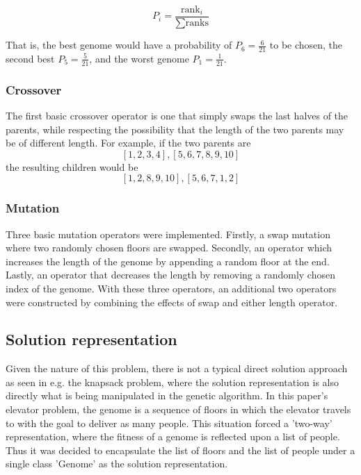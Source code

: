     $$ P_i = \frac{\text{rank}_i}{\sum \text{ranks}} $$

    That is, the best genome would have a probability of $ P_6 = \frac{6}{21} $ to be chosen, the second best $ P_5 = \frac{5}{21} $, and the worst genome $ P_1 = \frac{1}{21} $.

\subsubsection{Crossover}

	The first basic crossover operator is one that simply swaps the last halves of the parents, while respecting the possibility that the length of the two parents may be of different length. For example, if the two parents are $$ [1, 2, 3, 4], [5, 6, 7, 8, 9, 10] $$ the resulting children would be $$ [1, 2, 8, 9, 10], [5, 6, 7, 1, 2] $$

\subsubsection{Mutation}

	Three basic mutation operators were implemented. Firstly, a swap mutation where two randomly chosen floors are swapped. Secondly, an operator which increases the length of the genome by appending a random floor at the end. Lastly, an operator that decreases the length by removing a randomly chosen index of the genome. With these three operators, an additional two operators were constructed by combining the effects of swap and either length operator.


\subsection{Solution representation}

    Given the nature of this problem, there is not a typical direct solution approach as seen in e.g. the knapsack problem, where the solution representation is also directly what is being manipulated in the genetic algorithm. In this paper's elevator problem, the genome is a sequence of floors in which the elevator travels to with the goal to deliver as many people. This situation forced a 'two-way' representation, where the fitness of a genome is reflected upon a list of people. Thus it was decided to encapsulate the list of floors and the list of people under a single class 'Genome' as the solution representation.

